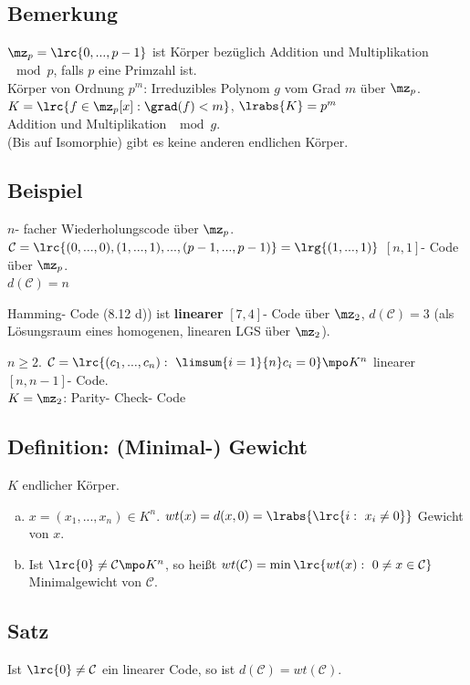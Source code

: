	\subsection{Bemerkung}
		$ \mz_p=\lrc{0,...,p-1} $ ist Körper bezüglich Addition und Multiplikation $ \mod p $, falls $ p $ eine Primzahl ist.\\
		Körper von Ordnung $ p^m $: Irreduzibles Polynom $ g $ vom Grad $ m $ über $ \mz_p $.\\
		$ K=\lrc{f\in\mz_p[x]:\grad(f)<m} $, $ \lrabs{K}=p^m $\\
		Addition und Multiplikation $ \mod g $.\\
		(Bis auf Isomorphie) gibt es keine anderen endlichen Körper.
		
	\subsection{Beispiel}
		\item $ n $- facher Wiederholungscode über $ \mz_p $.\\
		$ \mathcal{C}=\lrc{(0,...,0),(1,...,1),...,(p-1,...,p-1)}=\lrg{(1,...,1)} $ $ [n,1] $- Code über $ \mz_p $.\\
		$ d(\mathcal{C})=n $
		\item Hamming- Code (8.12 d)) ist \textbf{linearer} $ [7,4] $- Code über $ \mz_2 $, $ d(\mathcal{C})=3 $ (als Lösungsraum eines homogenen, linearen LGS über $ \mz_2 $).
		\item $ n\geq 2 $. $ \mathcal{C}=\lrc{(c_1,...,c_n):\ \limsum{i=1}{n}c_i=0}\mpo K^n $ linearer $ [n,n-1] $- Code.\\
		$ K=\mz_2 $: Parity- Check- Code
		\subExEnd
		
	\subsection{Definition: (Minimal-) Gewicht}
		$ K $ endlicher Körper.
		\begin{enumerate}[a)]
			\item $ x= (x_1,...,x_n)\in K^n$. $ wt(x)=d(x,0)=\lrabs{\lrc{i:\ x_i\neq 0}} $ Gewicht von $ x $.
			\item Ist $ \lrc{0}\neq\mathcal{C}\mpo K^n $, so heißt $ wt(\mathcal{C})=\min\lrc{wt(x):\ 0\neq x\in\mathcal{C}} $\\
			Minimalgewicht von $ \mathcal{C} $.
		\end{enumerate}
		
	\subsection{Satz}
		Ist $ \lrc{0}\neq\mathcal{C} $ ein linearer Code, so ist $ d(\mathcal{C})=wt(\mathcal{C}) $.
		
